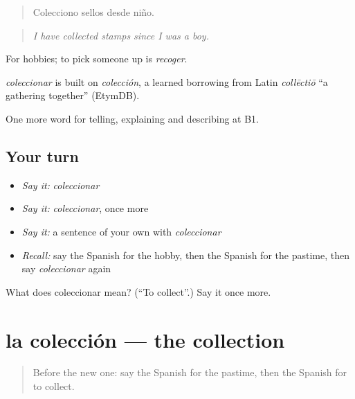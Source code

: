 \begin{quote}
Colecciono sellos desde niño.
\end{quote}

\begin{quote}
\emph{I have collected stamps since I was a boy.}
\end{quote}

For hobbies; to pick someone up is \emph{recoger}.

\begin{cousinweb}
\emph{coleccionar} is built on \emph{colección}, a learned borrowing from Latin \emph{collēctiō} \textquotedblleft{}a gathering together\textquotedblright{} (EtymDB).
\end{cousinweb}

\begin{grammarlens}[title={What you've built}]
One more word for telling, explaining and describing at B1.
\end{grammarlens}

\subsection*{Your turn}
\begin{itemize}
\raggedright
  \item \emph{Say it:} \emph{coleccionar}
  \item \emph{Say it:} \emph{coleccionar}, once more
  \item \emph{Say it:} a sentence of your own with \emph{coleccionar}
  \item \emph{Recall:} say the Spanish for the hobby, then the Spanish for the pastime, then say \emph{coleccionar} again
\end{itemize}

\begin{tcolorbox}[breakable,colback=teal!4,colframe=teal!35!black,title={Before you move on}]
What does coleccionar mean? (\textquotedblleft{}To collect\textquotedblright{}.) Say it once more.
\end{tcolorbox}
\section[la colección]{la colección — the collection}

\label{lesson:ES-C751-coleccion}



\begin{quote}
Before the new one: say the Spanish for the pastime, then the Spanish for to collect.
\end{quote}

